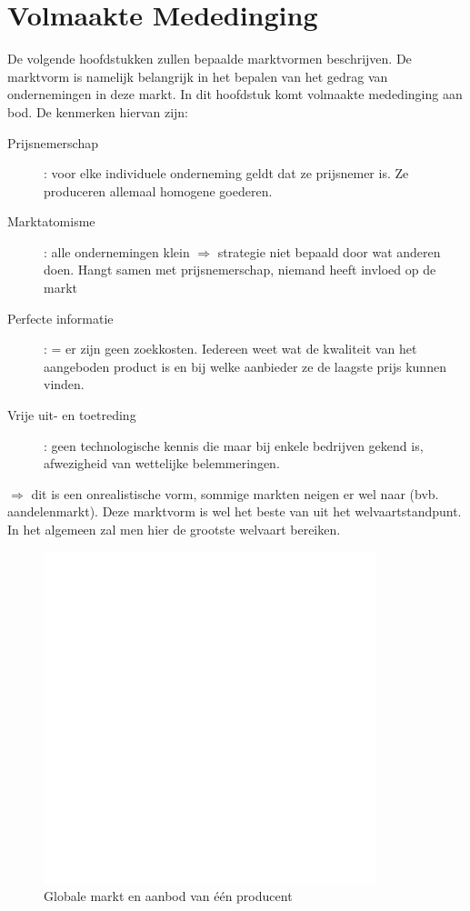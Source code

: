 \section{Volmaakte Mededinging}
De volgende hoofdstukken zullen bepaalde marktvormen beschrijven. De marktvorm is namelijk belangrijk in het bepalen van het gedrag van ondernemingen in deze markt. In dit hoofdstuk komt volmaakte mededinging aan bod. De kenmerken hiervan zijn:
\begin{description}
   \item[Prijsnemerschap]: voor elke individuele onderneming geldt dat ze prijsnemer is. Ze produceren allemaal homogene goederen.
   \item[Marktatomisme]: alle ondernemingen klein $\Rightarrow$ strategie niet bepaald door wat anderen doen. Hangt samen met prijsnemerschap, niemand heeft invloed op de markt
   \item[Perfecte informatie]: = er zijn geen zoekkosten. Iedereen weet wat de kwaliteit van het aangeboden product is en bij welke aanbieder ze de laagste prijs kunnen vinden.
   \item[Vrije uit- en toetreding]: geen technologische kennis die maar bij enkele bedrijven gekend is, afwezigheid van wettelijke belemmeringen.
\end{description}
$\Rightarrow$ dit is een onrealistische vorm, sommige markten neigen er wel naar (bvb. aandelenmarkt). Deze marktvorm is wel het beste van uit het welvaartstandpunt. In het algemeen zal men hier de grootste welvaart bereiken.

\begin{figure}[htbp]
   \centering
   \includegraphics[scale=0.4]{Images/white.png}
   \caption{Globale markt en aanbod van \'e\'en producent}
   \label{fig:globaleMarktEnAanbodEenProducent}
\end{figure}

